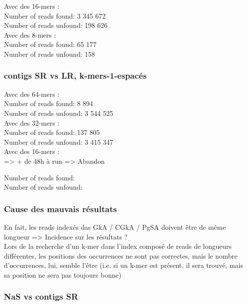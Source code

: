 \documentclass[12pt]{article}
\begin{document}
Avec des 16-mers : \\

Number of reads found: 3 345 672 \\
Number of reads unfound: 198 626 \\

Avec des 8-mers : \\

Number of reads found: 65 177 \\
Number of reads unfound: 158 \\

\subsubsection{contigs SR vs LR, k-mers-1-espacés}

Avec des 64-mers : \\

Number of reads found: 8 894 \\
Number of reads unfound: 3 544 525 \\

Avec des 32-mers : \\

Number of reads found: 137 805 \\
Number of reads unfound: 3 415 347 \\

Avec des 16-mers : \\ => + de 48h à run => Abandon

Number of reads found:  \\
Number of reads unfound:  \\

\subsubsection{Cause des mauvais résultats}

En fait, les reads indexés das GkA / CGkA / PgSA doivent être de même longueur => Incidence sur les résultats ? \\
Lors de la recherche d'un k-mer dans l'index composé de reads de longueurs différentes, les positions des occurrences ne sont pas correctes,
mais le nombre d'occurrences, lui, semble l'être (i.e. si un k-mer est présent, il sera trouvé, mais sa position ne sera pas toujours bonne)


\subsubsection{NaS vs contigs SR}
\end{document}
